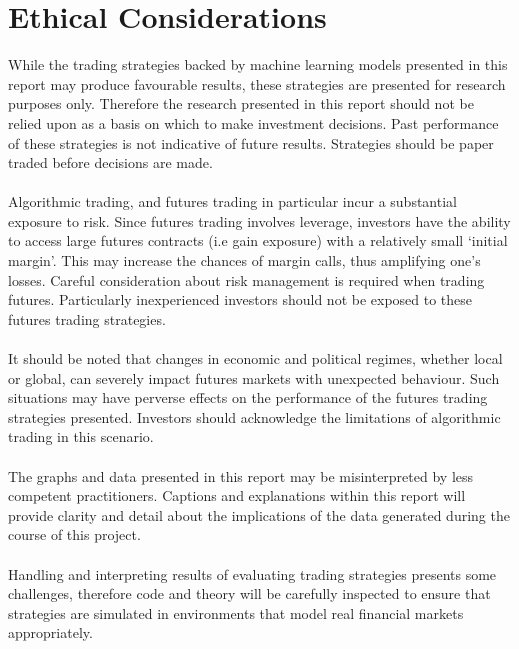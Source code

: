 \chapter{Ethical Considerations}

While the trading strategies backed by machine learning models presented in this report may produce favourable results, these strategies are presented for research purposes only. Therefore the research presented in this report should not be relied upon as a basis on which to make investment decisions. Past performance of these strategies is not indicative of future results. Strategies should be paper traded before decisions are made. \\ \\
Algorithmic trading, and futures trading in particular incur a substantial exposure to risk. Since futures trading involves leverage, investors have the ability to access large futures contracts (i.e gain exposure) with a relatively small `initial margin'. This may increase the chances of margin calls, thus amplifying one's losses. Careful consideration about risk management is required when trading futures. Particularly inexperienced investors should not be exposed to these futures trading strategies. \\ \\
It should be noted that changes in economic and political regimes, whether local or global, can severely impact futures markets with unexpected behaviour. Such situations may have perverse effects on the performance of the futures trading strategies presented. Investors should acknowledge the limitations of algorithmic trading in this scenario. \\ \\
The graphs and data presented in this report may be misinterpreted by less competent practitioners. Captions and explanations within this report will provide clarity and detail about the implications of the data generated during the course of this project.  \\ \\
Handling and interpreting results of evaluating trading strategies presents some challenges, therefore code and theory will be carefully inspected to ensure that strategies are simulated in environments that model real financial markets appropriately.
